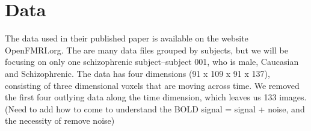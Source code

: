 \section{Data}

The data used in their published paper is available on the website OpenFMRI.org.
The are many data files grouped by subjects, but we will be focusing on only one
schizophrenic subject--subject 001, who is male, Caucasian and Schizophrenic.
The data has four dimensions (91 x 109 x 91 x 137), consisting of three dimensional 
voxels that are moving across time. We removed the first four outlying data along 
the time dimension, which leaves us 133 images. (Need to add how to come to 
understand the BOLD signal = signal + noise, and the necessity of remove noise)

